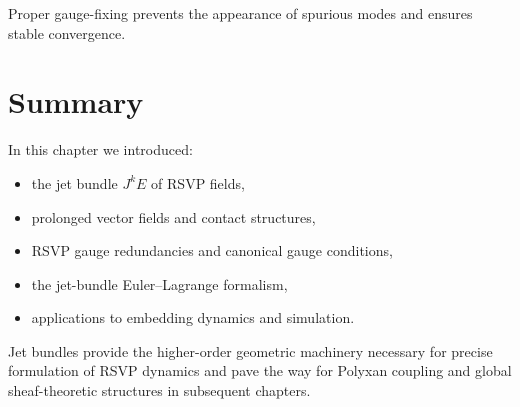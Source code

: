 Proper gauge-fixing prevents the appearance of spurious modes and ensures stable convergence.

\section{Summary}

In this chapter we introduced:
\begin{itemize}
\item the jet bundle $J^k E$ of RSVP fields,
\item prolonged vector fields and contact structures,
\item RSVP gauge redundancies and canonical gauge conditions,
\item the jet-bundle Euler–Lagrange formalism,
\item applications to embedding dynamics and simulation.
\end{itemize}

Jet bundles provide the higher-order geometric machinery necessary for precise formulation of RSVP dynamics and pave the way for Polyxan coupling and global sheaf-theoretic structures in subsequent chapters.
